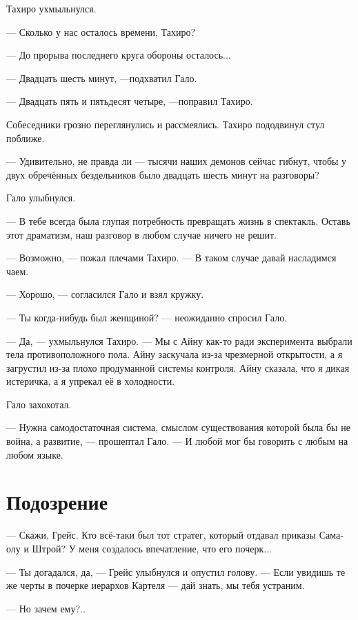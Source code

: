 \documentclass[a4paper,12pt,fleqn]{book}\usepackage{cooltooltips}\usepackage{polyglossia}\setdefaultlanguage[babelshorthands=true]{russian}\setotherlanguage{english}\defaultfontfeatures{Ligatures=TeX,Mapping=tex-text} \usepackage{xcolor}\definecolor{lightgray}{HTML}{bbbbbb}\color{lightgray}\newcommand{\ml}[3]{\textenglish{\textcolor{black}{#3}}}
\newcommand{\textspace}{\vspace{1em}{\centering\Large\bfseries<...>\par}\vspace{1em}}
\begin{document}
{Тахиро ухмыльнулся.

--- Сколько у нас осталось времени, Тахиро?

--- До прорыва последнего круга обороны осталось...

--- Двадцать шесть минут, ---подхватил Гало.

--- Двадцать пять и пятьдесят четыре, ---поправил Тахиро.

Собеседники грозно переглянулись и рассмеялись.
Тахиро пододвинул стул поближе.

--- Удивительно, не правда ли --- тысячи наших демонов сейчас гибнут, чтобы у двух обречённых бездельников было двадцать шесть минут на разговоры?

Гало улыбнулся.

--- В тебе всегда была глупая потребность превращать жизнь в спектакль.
Оставь этот драматизм, наш разговор в любом случае ничего не решит.

--- Возможно, --- пожал плечами Тахиро.
--- В таком случае давай насладимся чаем.

--- Хорошо, --- согласился Гало и взял кружку.

\textspace

--- Ты когда-нибудь был женщиной? --- неожиданно спросил Гало.

--- Да, --- ухмыльнулся Тахиро.
--- Мы с Айну как-то ради эксперимента выбрали тела противоположного пола.
Айну заскучала из-за чрезмерной открытости, а я загрустил из-за плохо продуманной системы контроля.
Айну сказала, что я дикая истеричка, а я упрекал её в холодности.

Гало захохотал.

\textspace

--- Нужна самодостаточная система, смыслом существования которой была бы не война, а развитие, --- прошептал Гало.
--- И любой мог бы говорить с любым на любом языке.

\section{Подозрение}

--- Скажи, Грейс.
Кто всё-таки был тот стратег, который отдавал приказы Самаолу и Штрой?
У меня создалось впечатление, что его почерк...

--- Ты догадался, да, --- Грейс улыбнулся и опустил голову.
--- Если увидишь те же черты в почерке иерархов Картеля --- дай знать, мы тебя устраним.

--- Но зачем ему?..

}
\end{document}

